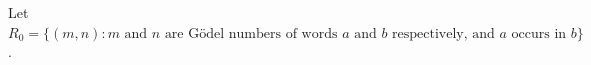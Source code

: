 Let $R_0 = \{(m, n) : m \text{ and } n \text{ are Gödel numbers of words } a \text{ and } b \text{ respectively, and } a \text{ occurs in } b\}$.
